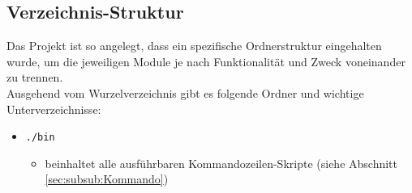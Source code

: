 \documentclass[10pt]{article}
\begin{document}
\subsection{Verzeichnis-Struktur}
\label{sec:verzeichnis}
Das Projekt ist so angelegt, dass ein spezifische Ordnerstruktur eingehalten wurde, um die jeweiligen Module je nach Funktionalität und Zweck voneinander zu trennen. \\
Ausgehend vom Wurzelverzeichnis gibt es folgende Ordner und wichtige Unterverzeichnisse:

\begin{itemize}
	\item[] \texttt{./bin}
	\begin{itemize}
		\item beinhaltet alle ausführbaren Kommandozeilen-Skripte (siehe Abschnitt \ref{sec:subsub:Kommando})
	\end{itemize}


\end{itemize}
\end{document}
